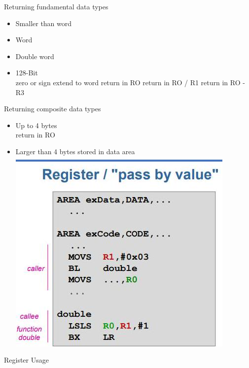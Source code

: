 Returning fundamental data types

\begin{itemize}
  \item Smaller than word
  \item Word
  \item Double word
  \item 128-Bit\\
zero or sign extend to word return in RO return in RO / R1 return in RO - R3
\end{itemize}

Returning composite data types

\begin{itemize}
  \item Up to 4 bytes\\
return in RO
  \item Larger than 4 bytes stored in data area\\
\includegraphics[width=\linewidth]{images/2024_12_29_79e6b22f503fb7b4f718g-09(2)}
\end{itemize}

Register Usage

